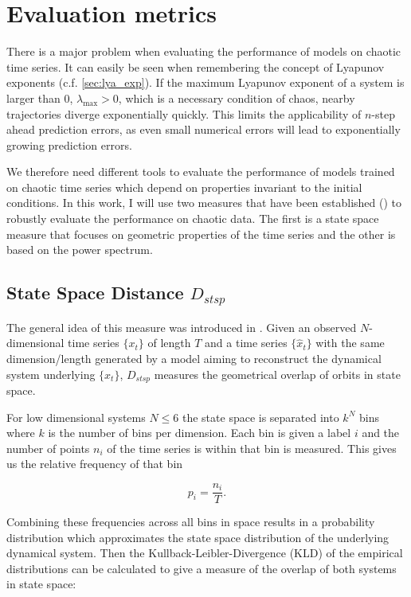 \section{Evaluation metrics} \label{sec:eval_metrics}

There is a major problem when evaluating the performance of models on chaotic time series. It can easily be seen when remembering the concept of Lyapunov exponents 
(c.f. \ref{sec:lya_exp}). If the maximum Lyapunov exponent of a system is larger than $0$, $\lambda_{\max} > 0$, which is a necessary condition of chaos, nearby trajectories
diverge exponentially quickly. This limits the applicability of $n$-step ahead prediction errors, as even small numerical errors will lead to exponentially growing 
prediction errors.

We therefore need different tools to evaluate the performance of models trained on chaotic time series which depend on properties invariant to the initial conditions.
In this work, I will use two measures that have been established (\cite{mikhaeil2022difficulty}) to robustly evaluate the performance on chaotic data. 
The first is a state space measure that focuses on geometric properties of the time series and the other is based on the power spectrum. 

\subsection{State Space Distance \texorpdfstring{$D_{stsp}$}{Lg}} \label{sec:d_stsp}

The general idea of this measure was introduced in \cite{koppe2019identifying}. 
Given an observed $N$-dimensional time series $\{x_t\}$ of length $T$ and a
time series $\{\hat{x}_t\}$ with the same dimension/length generated by a model aiming to reconstruct the dynamical system underlying $\{x_t\}$, $D_{stsp}$ measures
the geometrical overlap of orbits in state space.

For low dimensional systems $N \leq 6$ the state space is separated into $k^N$ bins where $k$ is the number of bins per dimension. Each bin is given a label $i$ and 
the number of points $n_i$ of the time series is within that bin is measured. This gives us the relative frequency of that bin

\begin{equation}
    p_i = \frac{n_i}{T}.
    \label{eq:rel_freq}
\end{equation}

Combining these frequencies across all bins in space results in a probability distribution which approximates the state space distribution of the underlying dynamical system.
Then the Kullback-Leibler-Divergence (KLD) of the empirical distributions can be calculated to give a measure of the overlap of both systems in state space:

